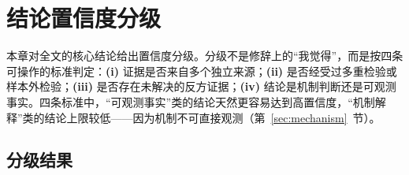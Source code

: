 \section{结论置信度分级}\label{sec:confidence}

本章对全文的核心结论给出置信度分级。分级不是修辞上的“我觉得”，而是按四条可操作的标准判定：\textbf{(i)} 证据是否来自多个独立来源；\textbf{(ii)} 是否经受过多重检验或样本外检验；\textbf{(iii)} 是否存在未解决的反方证据；\textbf{(iv)} 结论是机制判断还是可观测事实。四条标准中，“可观测事实”类的结论天然更容易达到高置信度，“机制解释”类的结论上限较低——因为机制不可直接观测（第~\ref{sec:mechanism}~节）。

\subsection{分级结果}

\newcommand{\lvA}{\textbf{高}}
\newcommand{\lvB}{\textbf{中}}
\newcommand{\lvC}{\textit{低}}

